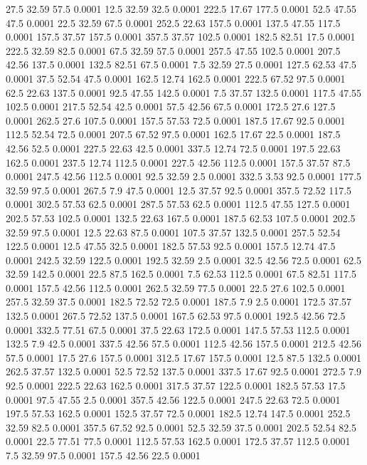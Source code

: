 27.5	32.59	57.5	0.0001
12.5	32.59	32.5	0.0001
222.5	17.67	177.5	0.0001
52.5	47.55	47.5	0.0001
22.5	32.59	67.5	0.0001
252.5	22.63	157.5	0.0001
137.5	47.55	117.5	0.0001
157.5	37.57	157.5	0.0001
357.5	37.57	102.5	0.0001
182.5	82.51	17.5	0.0001
222.5	32.59	82.5	0.0001
67.5	32.59	57.5	0.0001
257.5	47.55	102.5	0.0001
207.5	42.56	137.5	0.0001
132.5	82.51	67.5	0.0001
7.5	32.59	27.5	0.0001
127.5	62.53	47.5	0.0001
37.5	52.54	47.5	0.0001
162.5	12.74	162.5	0.0001
222.5	67.52	97.5	0.0001
62.5	22.63	137.5	0.0001
92.5	47.55	142.5	0.0001
7.5	37.57	132.5	0.0001
117.5	47.55	102.5	0.0001
217.5	52.54	42.5	0.0001
57.5	42.56	67.5	0.0001
172.5	27.6	127.5	0.0001
262.5	27.6	107.5	0.0001
157.5	57.53	72.5	0.0001
187.5	17.67	92.5	0.0001
112.5	52.54	72.5	0.0001
207.5	67.52	97.5	0.0001
162.5	17.67	22.5	0.0001
187.5	42.56	52.5	0.0001
227.5	22.63	42.5	0.0001
337.5	12.74	72.5	0.0001
197.5	22.63	162.5	0.0001
237.5	12.74	112.5	0.0001
227.5	42.56	112.5	0.0001
157.5	37.57	87.5	0.0001
247.5	42.56	112.5	0.0001
92.5	32.59	2.5	0.0001
332.5	3.53	92.5	0.0001
177.5	32.59	97.5	0.0001
267.5	7.9	47.5	0.0001
12.5	37.57	92.5	0.0001
357.5	72.52	117.5	0.0001
302.5	57.53	62.5	0.0001
287.5	57.53	62.5	0.0001
112.5	47.55	127.5	0.0001
202.5	57.53	102.5	0.0001
132.5	22.63	167.5	0.0001
187.5	62.53	107.5	0.0001
202.5	32.59	97.5	0.0001
12.5	22.63	87.5	0.0001
107.5	37.57	132.5	0.0001
257.5	52.54	122.5	0.0001
12.5	47.55	32.5	0.0001
182.5	57.53	92.5	0.0001
157.5	12.74	47.5	0.0001
242.5	32.59	122.5	0.0001
192.5	32.59	2.5	0.0001
32.5	42.56	72.5	0.0001
62.5	32.59	142.5	0.0001
22.5	87.5	162.5	0.0001
7.5	62.53	112.5	0.0001
67.5	82.51	117.5	0.0001
157.5	42.56	112.5	0.0001
262.5	32.59	77.5	0.0001
22.5	27.6	102.5	0.0001
257.5	32.59	37.5	0.0001
182.5	72.52	72.5	0.0001
187.5	7.9	2.5	0.0001
172.5	37.57	132.5	0.0001
267.5	72.52	137.5	0.0001
167.5	62.53	97.5	0.0001
192.5	42.56	72.5	0.0001
332.5	77.51	67.5	0.0001
37.5	22.63	172.5	0.0001
147.5	57.53	112.5	0.0001
132.5	7.9	42.5	0.0001
337.5	42.56	57.5	0.0001
112.5	42.56	157.5	0.0001
212.5	42.56	57.5	0.0001
17.5	27.6	157.5	0.0001
312.5	17.67	157.5	0.0001
12.5	87.5	132.5	0.0001
262.5	37.57	132.5	0.0001
52.5	72.52	137.5	0.0001
337.5	17.67	92.5	0.0001
272.5	7.9	92.5	0.0001
222.5	22.63	162.5	0.0001
317.5	37.57	122.5	0.0001
182.5	57.53	17.5	0.0001
97.5	47.55	2.5	0.0001
357.5	42.56	122.5	0.0001
247.5	22.63	72.5	0.0001
197.5	57.53	162.5	0.0001
152.5	37.57	72.5	0.0001
182.5	12.74	147.5	0.0001
252.5	32.59	82.5	0.0001
357.5	67.52	92.5	0.0001
52.5	32.59	37.5	0.0001
202.5	52.54	82.5	0.0001
22.5	77.51	77.5	0.0001
112.5	57.53	162.5	0.0001
172.5	37.57	112.5	0.0001
7.5	32.59	97.5	0.0001
157.5	42.56	22.5	0.0001
